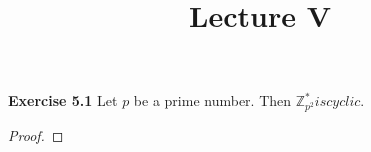\documentclass{article}
\title{\vspace{-2cm}Lecture V\vspace{-2cm}}
\date{}
\begin{document}
\maketitle
\noindent \textbf{Exercise 5.1}  Let $p$ be a prime number. Then $\mathbb{Z}^{*}_{p^2} is cyclic.$
\begin{proof}
\end{proof}
\end{document}
